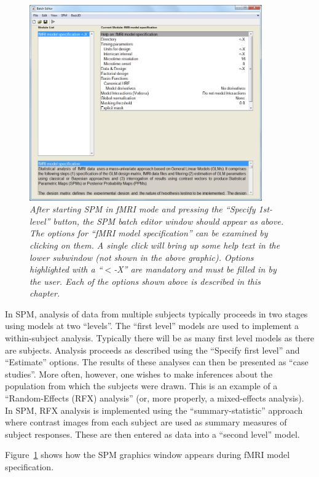 \begin{figure}
\begin{center}
\includegraphics[width=100mm]{fmri_spec/fmri_model}
\end{center}
\caption{\em After starting SPM in fMRI mode and pressing the ``Specify 1st-level'' button, the SPM batch editor window should appear as above. The options for ``fMRI model specification'' can be examined by clicking on them. A single click will bring up some help text in the lower subwindow (not shown in the above graphic). Options highlighted with a ``$<$-X'' are mandatory and must be filled in by the user. Each of the options shown above is described in this chapter. \label{spec}}
\end{figure}

In SPM, analysis of data from multiple subjects typically proceeds in two stages using models at two ``levels''. The ``first level'' models are used to implement a within-subject analysis. Typically there will be as many first level models as there are subjects. Analysis proceeds as described using the ``Specify first level'' and ``Estimate'' options. The results of these analyses can then be presented as ``case studies''. More often, however, one wishes to make inferences about the population from which the subjects were drawn. This is an example of a ``Random-Effects (RFX) analysis'' (or, more properly, a mixed-effects analysis). In SPM, RFX analysis is implemented using the ``summary-statistic'' approach where contrast images from each subject are used as summary measures of subject responses. These are then entered as data into a ``second level'' model.

Figure~\ref{spec} shows how the SPM graphics window appears during fMRI model specification.

